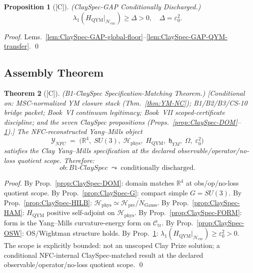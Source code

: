 \documentclass[12pt,oneside]{amsbook}
\theoremstyle{plain}
\newtheorem{theorem}{Theorem}[section]
\newtheorem{proposition}[theorem]{Proposition}
\theoremstyle{definition}
\theoremstyle{remark}
\newcommand{\status}[1]{\textup{[#1]}}
\begin{document}
\begin{proposition}[\status{C}]\label{prop:ClaySpec-GAP}
\textup{(ClaySpec-GAP Conditionally Discharged.)}
\[
 \boxed{\lambda_1(H_{\mathrm{QYM}}|_{\mathcal{H}_{\mathrm{exc}}})\ge\Delta>0,\quad\Delta=\varepsilon_0^2.}
\]
\end{proposition}

\begin{proof}
Lems.~\ref{lem:ClaySpec-GAP-global-floor}--\ref{lem:ClaySpec-GAP-QYM-transfer}.
\qed
\end{proof}

\subsection{Assembly Theorem}

\begin{theorem}[\status{C}]\label{thm:B1-ClaySpec-match}
\textup{(B1-ClaySpec Specification-Matching Theorem.)}
\textup{[Conditional on: MSC-normalized YM closure stack
(Thm.~\ref{thm:YM-NC}); B1/B2/B3/CS-10 bridge packet; Book~VI
continuum legitimacy; Book~VII scoped-certificate discipline; and the
seven ClaySpec propositions
(Props.~\ref{prop:ClaySpec-DOM}--\ref{prop:ClaySpec-GAP}).]}
The NFC-reconstructed Yang--Mills object
\[
 \mathcal{Y}_{NFC} \;=\;
 \bigl(\mathbb{R}^4,\; SU(3),\; \mathcal{H}_{\mathrm{phys}},\;
 H_{\mathrm{QYM}},\; \mathfrak{h}_{YM},\; \Omega,\;
 \varepsilon_0^2\bigr)
\]
satisfies the Clay Yang--Mills specification at the declared
observable/operator/no-loss quotient scope. Therefore:
\[
 \boxed{ob{:}B1\text{-}ClaySpec \;\leadsto\; \text{conditionally discharged.}}
\]
\end{theorem}

\begin{proof}
By Prop.~\ref{prop:ClaySpec-DOM}: domain matches $\mathbb{R}^4$ at
obs/op/no-loss quotient scope.
By Prop.~\ref{prop:ClaySpec-G}: compact simple $G=SU(3)$.
By Prop.~\ref{prop:ClaySpec-HILB}: $\mathcal{H}_{\mathrm{phys}}\simeq
\overline{\mathcal{H}_{\mathrm{pre}}/N_{\mathrm{Gauss}}}$.
By Prop.~\ref{prop:ClaySpec-HAM}: $H_{\mathrm{QYM}}$ positive
self-adjoint on $\mathcal{H}_{\mathrm{phys}}$.
By Prop.~\ref{prop:ClaySpec-FORM}: form is the Yang--Mills
curvature-energy form on $\mathcal{C}_{\mathrm{tr}}$.
By Prop.~\ref{prop:ClaySpec-OSW}: OS/Wightman structure holds.
By Prop.~\ref{prop:ClaySpec-GAP}:
$\lambda_1(H_{\mathrm{QYM}}|_{\mathcal{H}_{\mathrm{exc}}})\ge\varepsilon_0^2>0$.
The scope is explicitly bounded: not an unscoped Clay Prize solution;
a conditional NFC-internal ClaySpec-matched result at the declared
observable/operator/no-loss quotient scope.
\qed
\end{proof}
\end{document}
